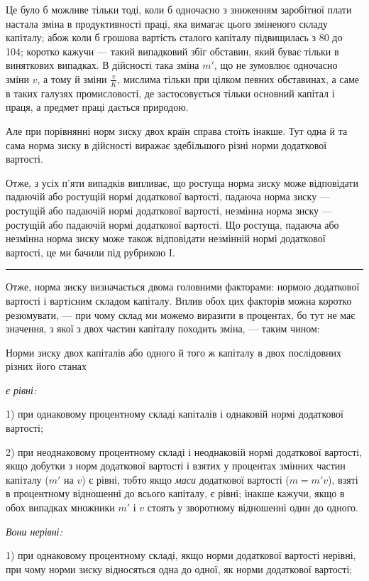
Це було б можливе тільки тоді, коли б одночасно з зниженням
заробітної плати настала зміна в продуктивності праці, яка
вимагає цього зміненого складу капіталу; абож коли б грошова вартість
сталого капіталу підвищилась з 80 до 104; коротко кажучи —
такий випадковий збіг обставин, який буває тільки в виняткових
випадках. В дійсності така зміна $m'$, що не зумовлює одночасно
зміни $v$, а тому й зміни $\frac{v}{K}$, мислима тільки при цілком певних
обставинах, а саме в таких галузях промисловості, де застосовується
тільки основний капітал і праця, а предмет праці дається
природою.

Але при порівнянні норм зиску двох країн справа стоїть
інакше. Тут одна й та сама норма зиску в дійсності виражає
здебільшого різні норми додаткової вартості.

Отже, з усіх п’яти випадків випливає, що ростуща норма
зиску може відповідати падаючій або ростущій нормі додаткової
вартості, падаюча норма зиску — ростущій або падаючій
нормі додаткової вартості, незмінна норма зиску — ростущій або
падаючій нормі додаткової вартості. Що ростуща, падаюча або
незмінна норма зиску може також відповідати незмінній нормі
додаткової вартості, це ми бачили під рубрикою І.

\pfbreak

Отже, норма зиску визначається двома головними факторами:
нормою додаткової вартості і вартісним складом капіталу.
Вплив обох цих факторів можна коротко резюмувати, — при чому
склад ми можемо виразити в процентах, бо тут не має значення,
з якої з двох частин капіталу походить зміна, — таким чином:

Норми зиску двох капіталів або одного й того ж капіталу
в двох послідовних різних його станах

\emph{є рівні:}

1) при однаковому процентному складі капіталів і однаковій
нормі додаткової вартості;

2) при неоднаковому процентному складі і неоднаковій нормі
додаткової вартості, якщо добутки з норм додаткової вартості
і взятих у процентах змінних частин капіталу ($m'$ на $v$) є рівні,
тобто якщо \emph{маси} додаткової вартості ($m = m'v$), взяті в процентному
відношенні до всього капіталу, є рівні; інакше кажучи,
якщо в обох випадках множники $m'$ і $v$ стоять у зворотному
відношенні один до одного.

\emph{Вони нерівні:}

1) при однаковому процентному складі, якщо норми додаткової
вартості нерівні, при чому норми зиску відносяться одна до
одної, як норми додаткової вартості;
\parbreak{}  %
